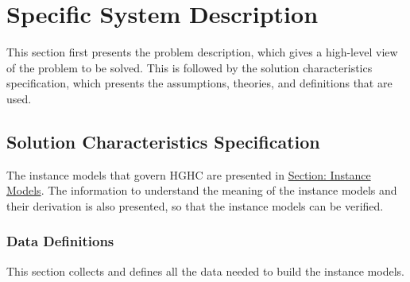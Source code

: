 \documentclass[12pt]{article}
\begin{document}
\section{Specific System Description}
\label{Sec:SpecSystDesc}
This section first presents the problem description, which gives a high-level view of the problem to be solved. This is followed by the solution characteristics specification, which presents the assumptions, theories, and definitions that are used.
\subsection{Solution Characteristics Specification}
\label{Sec:SolCharSpec}
The instance models that govern HGHC are presented in \hyperref[Sec:IMs]{Section: Instance Models}. The information to understand the meaning of the instance models and their derivation is also presented, so that the instance models can be verified.
\subsubsection{Data Definitions}
\label{Sec:DDs}
This section collects and defines all the data needed to build the instance models.
\par~
\end{document}
